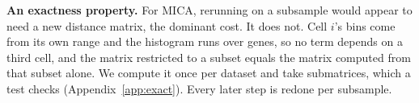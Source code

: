 \textbf{An exactness property.} For MICA, rerunning on a subsample would appear to need a new distance
matrix, the dominant cost. It does not. Cell $i$'s bins come from its own range and the histogram runs
over genes, so no term depends on a third cell, and the matrix restricted to a subset equals the matrix
computed from that subset alone. We compute it once per dataset and take submatrices, which a test
checks (Appendix~\ref{app:exact}). Every later step is redone per subsample.

